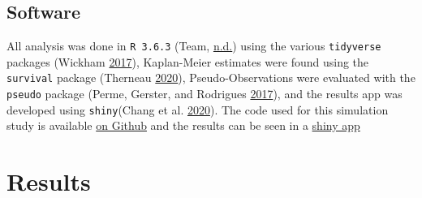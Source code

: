 \documentclass[
]{article}
\begin{document}
\hypertarget{software}{%
\subsection{Software}\label{software}}

All analysis was done in \texttt{R\ 3.6.3} (Team, \protect\hyperlink{ref-r_core_team_r_nodate}{n.d.}) using the various \texttt{tidyverse} packages (Wickham \protect\hyperlink{ref-wickham_tidy_2017}{2017}), Kaplan-Meier estimates were found using the \texttt{survival} package (Therneau \protect\hyperlink{ref-therneau_package_2020}{2020}), Pseudo-Observations were evaluated with the \texttt{pseudo} package (Perme, Gerster, and Rodrigues \protect\hyperlink{ref-perme_pseudo_2017}{2017}), and the results app was developed using \texttt{shiny}(Chang et al. \protect\hyperlink{ref-chang_shiny_2020}{2020}). The code used for this simulation study is available \href{https://github.com/MyKo101/IPCW-Logistic}{on Github} and the results can be seen in a \href{https://michael-barrowman.shinyapps.io/IPCW_Calibrations/?_ga=2.129261196.1072091615.1588464259-38998367.1584541320}{shiny app}

\hypertarget{results-1}{%
\section{Results}\label{results-1}}
\end{document}
